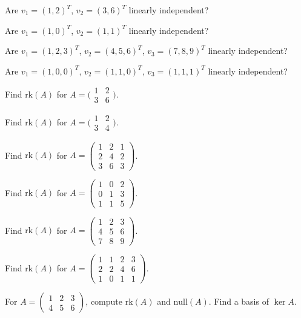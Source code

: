 \begin{problems}
    \item Are $v_{1} = (1, 2)^{T}$, $v_{2} = (3, 6)^{T}$ linearly independent?
    \item Are $v_{1} = (1, 0)^{T}$, $v_{2} = (1, 1)^{T}$ linearly independent?
    \item Are $v_{1} = (1, 2, 3)^{T}$, $v_{2} = (4, 5, 6)^{T}$, $v_{3} = (7, 8, 9)^{T}$ linearly independent?
    \item Are $v_{1} = (1, 0, 0)^{T}$, $v_{2} = (1, 1, 0)^{T}$, $v_{3} = (1, 1, 1)^{T}$ linearly independent?
    \item Find $\mathrm{rk}(A)$ for $A = \bigl(\begin{smallmatrix} 1 & 2 \\ 3 & 6 \end{smallmatrix}\bigr)$.
    \item Find $\mathrm{rk}(A)$ for $A = \bigl(\begin{smallmatrix} 1 & 2 \\ 3 & 4 \end{smallmatrix}\bigr)$.
    \item Find $\mathrm{rk}(A)$ for $A = \begin{pmatrix} 1 & 2 & 1 \\ 2 & 4 & 2 \\ 3 & 6 & 3 \end{pmatrix}$.
    \item Find $\mathrm{rk}(A)$ for $A = \begin{pmatrix} 1 & 0 & 2 \\ 0 & 1 & 3 \\ 1 & 1 & 5 \end{pmatrix}$.
    \item Find $\mathrm{rk}(A)$ for $A = \begin{pmatrix} 1 & 2 & 3 \\ 4 & 5 & 6 \\ 7 & 8 & 9 \end{pmatrix}$.
    \item Find $\mathrm{rk}(A)$ for $A = \begin{pmatrix} 1 & 1 & 2 & 3 \\ 2 & 2 & 4 & 6 \\ 1 & 0 & 1 & 1 \end{pmatrix}$.
    \item For $A = \begin{pmatrix} 1 & 2 & 3 \\ 4 & 5 & 6 \end{pmatrix}$, compute $\mathrm{rk}(A)$ and $\mathrm{null}(A)$. Find a basis of $\ker A$.

\end{problems}
